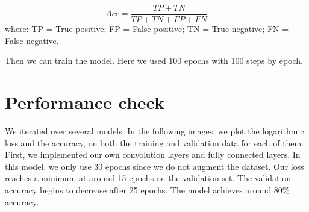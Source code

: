 \documentclass[]{book}
\newenvironment{Shaded}{\begin{snugshade}}{\end{snugshade}}
\newcommand{\DataTypeTok}[1]{\textcolor[rgb]{0.13,0.29,0.53}{#1}}
\newcommand{\DecValTok}[1]{\textcolor[rgb]{0.00,0.00,0.81}{#1}}
\newcommand{\FloatTok}[1]{\textcolor[rgb]{0.00,0.00,0.81}{#1}}
\newcommand{\KeywordTok}[1]{\textcolor[rgb]{0.13,0.29,0.53}{\textbf{#1}}}
\newcommand{\NormalTok}[1]{#1}
\newcommand{\OperatorTok}[1]{\textcolor[rgb]{0.81,0.36,0.00}{\textbf{#1}}}
\newcommand{\StringTok}[1]{\textcolor[rgb]{0.31,0.60,0.02}{#1}}
\begin{document}
\[Acc = \frac{TP + TN}{TP+TN+FP+FN}\]
where: TP = True positive; FP = False positive; TN = True negative; FN = False negative.

\begin{Shaded}
\end{Shaded}

Then we can train the model.
Here we used 100 epochs with 100 steps by epoch.

\begin{Shaded}
\end{Shaded}

\hypertarget{performance-check}{%
\section{Performance check}\label{performance-check}}

We iterated over several models.
In the following images, we plot the logarithmic loss and the accuracy, on both the training and validation data for each of them.
First, we implemented our own convolution layers and fully connected layers.
In this model, we only use 30 epochs since we do not augment the dataset. Our loss reaches a minimum at around 15 epochs on the validation set.
The validation accuracy begins to decrease after 25 epochs.
The model achieves around 80\% accuracy.
\end{document}
